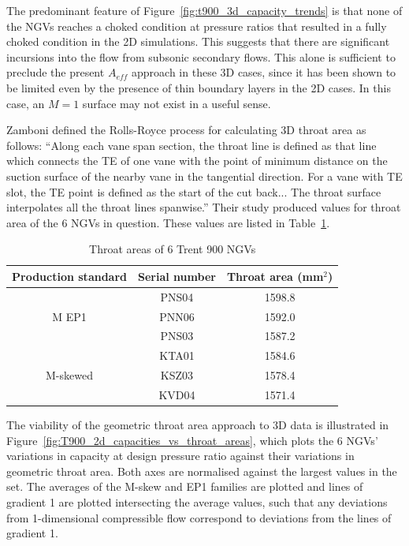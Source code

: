 \documentclass[a4paper, 11pt, oneside]{report}
\begin{document}
The predominant feature of Figure~\ref{fig:t900_3d_capacity_trends} is that none of the NGVs reaches a choked condition at pressure ratios that resulted in a fully choked condition in the 2D simulations. This suggests that there are significant incursions into the flow from subsonic secondary flows. This alone is sufficient to preclude the present $A_{eff}$ approach in these 3D cases, since it has been shown to be limited even by the presence of thin boundary layers in the 2D cases. In this case, an $M=1$ surface may not exist in a useful sense.

Zamboni defined the Rolls-Royce process for calculating 3D throat area as follows: ``Along each vane span section, the throat line is defined as that line which connects the TE of one vane with the point of minimum distance on the suction surface of the nearby vane in the tangential direction. For a vane with TE slot, the TE point is defined as the start of the cut back... The throat surface interpolates all the throat lines spanwise.'' Their study produced values for throat area of the 6 NGVs in question. These values are listed in Table~\ref{T900_throat_areas}.

\begin{table}[H]
\caption{Throat areas of 6 Trent 900 NGVs}
\label{T900_throat_areas}
\begin{center}
\begin{tabular}{|c|c|c|}
\hline
Production standard & Serial number & Throat area (mm$^2$)\\
\hline
\multirow{3}{*}{M EP1} & PNS04 & 1598.8\\
 & PNN06 & 1592.0\\
 & PNS03 & 1587.2\\
 \hline
 \multirow{3}{*}{M-skewed} & KTA01 & 1584.6\\
 & KSZ03 & 1578.4\\
 & KVD04 & 1571.4\\
\hline
\end{tabular}
\end{center}
\end{table}

The viability of the geometric throat area approach to 3D data is illustrated in Figure~\ref{fig:T900_2d_capacities_vs_throat_areas}, which plots the 6 NGVs' variations in capacity at design pressure ratio against their variations in geometric throat area. Both axes are normalised against the largest values in the set. The averages of the M-skew and EP1 families are plotted and lines of gradient 1 are plotted intersecting the average values, such that any deviations from 1-dimensional compressible flow correspond to deviations from the lines of gradient 1.
\end{document}
